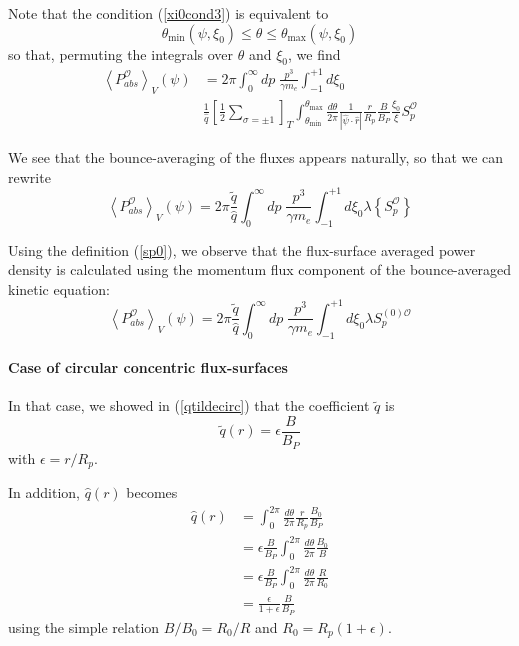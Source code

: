 Note that the condition (\ref{xi0cond3}) is equivalent to
\begin{equation}
\theta_{\min}\left( \psi,\xi_{0}\right) \leq\theta\leq\theta_{\max}\left(
\psi,\xi_{0}\right)  \label{thetacond}
\end{equation}
so that, permuting the integrals over $\theta$ and $\xi_{0}$, we find
\begin{align}
\left\langle P_{abs}^{\mathcal{O}}\right\rangle _{V}\left( \psi\right) &
=2\pi\int_{0}^{\infty}dp\;\frac{p^{3}}{\gamma m_{e}}\int_{-1}^{+1}d\xi_{0} \\
& \frac{1}{\widehat{q}}\left[ \frac{1}{2}\sum_{\sigma=\pm1}\right]
_{T}\int_{\theta_{\min}}^{\theta_{\max}}\frac{d\theta}{2\pi}\frac{1}{\left|
\widehat{\psi}\cdot\widehat{r}\right| }\frac{r}{R_{p}}\frac{B}{B_{P}}\frac{
\xi_{0}}{\xi}S_{p}^{\mathcal{O}}
\end{align}

We see that the bounce-averaging of the fluxes appears naturally, so that we
can rewrite
\begin{equation}
\left\langle P_{abs}^{\mathcal{O}}\right\rangle _{V}\left( \psi\right) =2\pi%
\frac{\widetilde{q}}{\widehat{q}}\int_{0}^{\infty}dp\;\frac{p^{3}}{\gamma
m_{e}}\int_{-1}^{+1}d\xi_{0}\lambda\left\{ S_{p}^{\mathcal{O}}\right\}
\end{equation}

Using the definition (\ref{sp0}), we observe that the flux-surface averaged
power density is calculated using the momentum flux component of the
bounce-averaged kinetic equation:
\begin{equation}
\left\langle P_{abs}^{\mathcal{O}}\right\rangle _{V}\left( \psi\right) =2\pi%
\frac{\widetilde{q}}{\widehat{q}}\int_{0}^{\infty}dp\;\frac{p^{3}}{\gamma
m_{e}}\int_{-1}^{+1}d\xi_{0}\lambda S_{p}^{\left( 0\right) \mathcal{O}}
\end{equation}

\paragraph{Case of circular concentric flux-surfaces}

In that case, we showed in (\ref{qtildecirc}) that the coefficient $%
\widetilde{q}$ is
\begin{equation}
\widetilde{q}\left( r\right) =\epsilon\frac{B}{B_{P}}  \label{qtildecirc2}
\end{equation}
with $\epsilon=r/R_{p}$.

In addition, $\widehat{q}\left( r\right) $ becomes
\begin{align}
\widehat{q}\left( r\right) & =\int_{0}^{2\pi}\frac{d\theta}{2\pi}\frac
{r}{R_{p}}\frac{B_{0}}{B_{P}}  \nonumber \\
& =\epsilon\frac{B}{B_{P}}\int_{0}^{2\pi}\frac{d\theta}{2\pi}\frac{B_{0}}{B}
\nonumber \\
& =\epsilon\frac{B}{B_{P}}\int_{0}^{2\pi}\frac{d\theta}{2\pi}\frac{R}{ R_{0}}
\nonumber \\
& =\frac{\epsilon}{1+\epsilon}\frac{B}{B_{P}}
\end{align}
using the simple relation $B/B_{0}=R_{0}/R$ and $R_{0}=R_{p}\left(
1+\epsilon\right) .$

